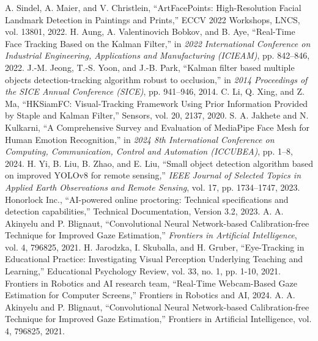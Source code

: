 \documentclass[conference]{IEEEtran}
\begin{document}
\begin{thebibliography}{23}
 A. Sindel, A. Maier, and V. Christlein, ``ArtFacePoints: High-Resolution Facial Landmark Detection in Paintings and Prints,'' ECCV 2022 Workshops, LNCS, vol. 13801, 2022.
 H. Aung, A. Valentinovich Bobkov, and B. Aye, ``Real-Time Face Tracking Based on the Kalman Filter,'' in \textit{2022 International Conference on Industrial Engineering, Applications and Manufacturing (ICIEAM)}, pp. 842--846, 2022.
 J.-M. Jeong, T.-S. Yoon, and J.-B. Park, ``Kalman filter based multiple objects detection-tracking algorithm robust to occlusion,'' in \textit{2014 Proceedings of the SICE Annual Conference (SICE)}, pp. 941--946, 2014.
 C. Li, Q. Xing, and Z. Ma, ``HKSiamFC: Visual-Tracking Framework Using Prior Information Provided by Staple and Kalman Filter,'' Sensors, vol. 20, 2137, 2020.
 S. A. Jakhete and N. Kulkarni, ``A Comprehensive Survey and Evaluation of MediaPipe Face Mesh for Human Emotion Recognition,'' in \textit{2024 8th International Conference on Computing, Communication, Control and Automation (ICCUBEA)}, pp. 1--8, 2024.
 H. Yi, B. Liu, B. Zhao, and E. Liu, ``Small object detection algorithm based on improved YOLOv8 for remote sensing,'' \textit{IEEE Journal of Selected Topics in Applied Earth Observations and Remote Sensing}, vol. 17, pp. 1734--1747, 2023. Honorlock Inc., ``AI-powered online proctoring: Technical specifications and detection capabilities,'' Technical Documentation, Version 3.2, 2023.
 A. A. Akinyelu and P. Blignaut, ``Convolutional Neural Network-based Calibration-free Technique for Improved Gaze Estimation,'' \textit{Frontiers in Artificial Intelligence}, vol. 4, 796825, 2021.
 H. Jarodzka, I. Skuballa, and H. Gruber, ``Eye-Tracking in Educational Practice: Investigating Visual Perception Underlying Teaching and Learning,'' Educational Psychology Review, vol. 33, no. 1, pp. 1-10, 2021.
 Frontiers in Robotics and AI research team, ``Real-Time Webcam-Based Gaze Estimation for Computer Screens,'' Frontiers in Robotics and AI, 2024.
 A. A. Akinyelu and P. Blignaut, ``Convolutional Neural Network-based Calibration-free Technique for Improved Gaze Estimation,'' Frontiers in Artificial Intelligence, vol. 4, 796825, 2021.
\end{thebibliography}
\end{document}
